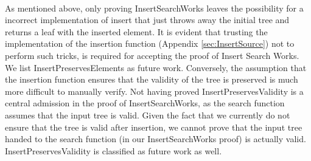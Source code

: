 \paragraph{}
As mentioned above, only proving InsertSearchWorks leaves the possibility for a incorrect implementation of insert that just throws away the initial tree and returns a leaf with the inserted element. It is evident that trusting the implementation of the insertion function (Appendix \ref{sec:InsertSource}) not to perform such tricks, is required for accepting the proof of Insert Search Works. We list InsertPreservesElements as future work. Conversely, the assumption that the insertion function ensures that the validity of the tree is preserved is much more difficult to manually verify. Not having proved InsertPreservesValidity is a central admission in the proof of InsertSearchWorks, as the search function assumes that the input tree is valid. Given the fact that we currently do not ensure that the tree is valid after insertion, we cannot prove that the input tree handed to the search function (in our InsertSearchWorks proof) is actually valid. InsertPreservesValidity is classified as future work as well.
